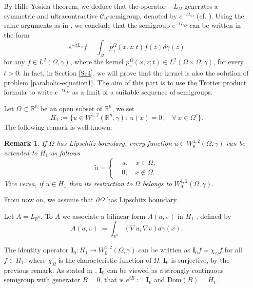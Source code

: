 \documentclass[12pt]{amsart}
\newtheorem{remark}[theorem]{Remark}
\newcommand{\R}{\mathbb R}
\newcommand{\1}{\mathbf 1}
\begin{document}
By Hille-Yosida theorem, we deduce that the operator $-L_\Omega$ generates a symmetric and ultracontractive $\mathcal{C}_0$-semigroup, denoted by $e^{-tL_\Omega}$ (cf. \cite{Pazy1983}). Using the same arguments as in \cite[Chapter 2]{DaviesBook}, we conclude that the semigroup $e^{-tL_\Omega}$ can be written in the form
\[
e^{-tL_\Omega}f=\int_\Omega p^\Omega_\gamma (x,z;t) f(z) d\gamma(z)
\]
for any $f\in L^2(\Omega,\gamma)$, where the kernel $p^{\Omega}_\gamma(x,z;t)\in L^2(\Omega \times \Omega,\gamma)$, for every $t>0$. In fact, in Section \ref{Se4}, we will prove that the kernel is also the solution of problem \eqref{parabolic-equation1}. The aim of this part is to use the Trotter product formula to write $e^{-tL_\Omega}$ as a limit of a suitable sequence of semigroups.

Let $\Omega\subset \R^n$ be an open subset of $\R^n$, we set
$$
H_1:=\{u\in W^{1,2}(\R^n,\gamma):\ u(x)=0,\quad\forall\ x\in \Omega^c\}.
$$
The following remark is well-known.

\begin{remark}
If $\Omega$ has Lipschitz boundary, every function $u\in W_0^{1,2}(\Omega,\gamma)$ can be extended to $H_1$ as follows
\[
\tilde{u}=\left\{
\begin{aligned}
& u,\quad x\in \Omega, \\
&  0,\quad  x\notin \Omega.
\end{aligned}
\right.
\]
Vice versa, if $u\in H_1$ then its restriction to $\Omega$ belongs to $W^{1,2}_0(\Omega,\gamma)$.
\end{remark}
From now on, we assume that $\partial\Omega$ has Lipschitz boundary.

Let $A=L_{\R^n}$. To $A$ we associate a bilinear form $A(u,\upsilon)$ in $H_1$ , defined by
$$
A(u,\upsilon):=\int_{\R^n} (\nabla u, \nabla \upsilon) d\gamma(x).
$$

The identity operator $\mathbf{I}_0\colon H_1\to W^{1,2}_0(\Omega,\gamma)$ can be written as $\mathbf{I}_0f=\chi_\Omega f$ for all $f\in H_1$, where $\chi_\Omega$ is the characteristic function of $\Omega$. $\mathbf{I}_0$ is surjective, by the previous remark. As stated in \cite{Book-Engel2000,Pazy1983}, $\mathbf{I}_0$ can be viewed as a strongly continuous semigroup with generator $B=0$, that is $e^{tB}:=\mathbf{I}_0$ and $\text{Dom}(B)=H_1$.
\end{document}
